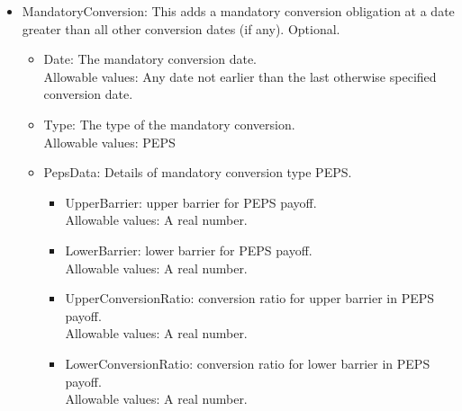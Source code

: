 \begin{itemize}
\item MandatoryConversion: This adds a mandatory conversion obligation at a date greater than all other conversion dates
  (if any). Optional.
  \begin{itemize}
  \item Date: The mandatory conversion date.\\
    Allowable values: Any date not earlier than the last otherwise specified conversion date.
  \item Type: The type of the mandatory conversion.\\
    Allowable values: PEPS
  \item PepsData: Details of mandatory conversion type PEPS.
    \begin{itemize}
      \item UpperBarrier: upper barrier for PEPS payoff.\\
        Allowable values: A real number.
      \item LowerBarrier: lower barrier for PEPS payoff.\\
        Allowable values:  A real number.
      \item UpperConversionRatio: conversion ratio for upper barrier in PEPS payoff.\\
        Allowable values: A real number.
      \item LowerConversionRatio: conversion ratio for lower barrier in PEPS payoff.\\
        Allowable values:  A real number.
    \end{itemize}
  \end{itemize}


\end{itemize}
